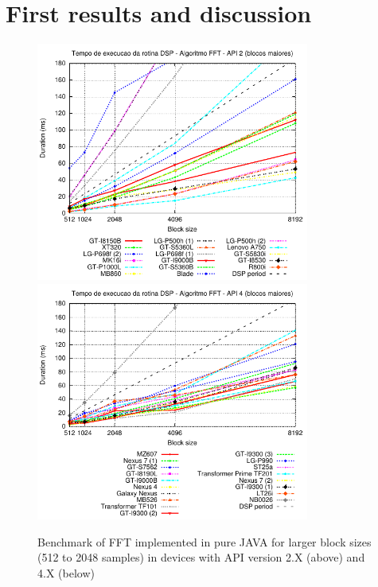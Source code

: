 \documentclass[12pt]{article}
\begin{document}
\section{First results and discussion}



\begin{figure}[h!]
\begin{center}
\includegraphics[width=0.8\textwidth]{img/FFT_ALGORITHM-2-b.pdf}
\includegraphics[width=0.8\textwidth]{img/FFT_ALGORITHM-4-b.pdf}
\end{center}
\caption{Benchmark of FFT implemented in pure JAVA for larger block
sizes (512 to 2048 samples) in devices with API version 2.X (above) and 4.X
(below)}
\label{fig:alg-fft}
\end{figure}
\end{document}
